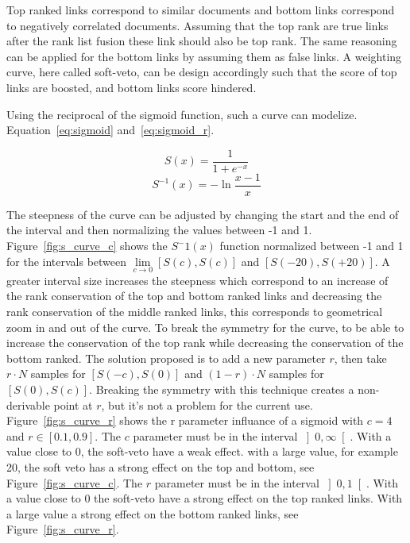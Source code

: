 Top ranked links correspond to similar documents and bottom links correspond to negatively correlated documents.
Assuming that the top rank are true links after the rank list fusion these link should also be top rank.
The same reasoning can be applied for the bottom links by assuming them as false links.
A weighting curve, here called soft-veto, can be design accordingly such that the score of top links are boosted, and bottom links score hindered.

Using the reciprocal of the sigmoid function, such a curve can modelize.
Equation~\ref{eq:sigmoid} and~\ref{eq:sigmoid_r}.

\begin{equation}
  \label{eq:sigmoid}
  S(x) = \frac{1}{1+e^{-x}}
\end{equation}
\begin{equation}
  \label{eq:sigmoid_r}
  S^{-1}(x) = -\ln{\frac{x-1}{x}}
\end{equation}

The steepness of the curve can be adjusted by changing the start and the end of the interval and then normalizing the values between -1 and 1.
Figure~\ref{fig:s_curve_c} shows the $S^-1(x)$ function normalized between -1 and 1 for the intervals between $\lim\limits_{c \rightarrow 0} \left[S(c), S(c)\right]$ and $\left[S(-20), S(+20)\right]$.
A greater interval size increases the steepness which correspond to an increase of the rank conservation of the top and bottom ranked links and decreasing the rank conservation of the middle ranked links, this corresponds to geometrical zoom in and out of the curve.
To break the symmetry for the curve, to be able to increase the conservation of the top rank while decreasing the conservation of the bottom ranked.
The solution proposed is to add a new parameter $r$, then take $r \cdot N$ samples for $\left[S(-c), S(0)\right]$ and $(1-r) \cdot N$ samples for $\left[S(0), S(c)\right]$.
Breaking the symmetry with this technique creates a non-derivable point at $r$, but it's not a problem for the current use.
Figure~\ref{fig:s_curve_r} shows the r parameter influance of a sigmoid with $c = 4$ and $r \in \left[0.1, 0.9\right]$.
The $c$ parameter must be in the interval $\left]0, \infty\right[$.
With a value close to $0$, the soft-veto have a weak effect.
with a large value, for example 20, the soft veto has a strong effect on the top and bottom, see Figure~\ref{fig:s_curve_c}.
The $r$ parameter must be in the interval $\left]0, 1\right[$.
With a value close to $0$ the soft-veto have a strong effect on the top ranked links.
With a large value a strong effect on the bottom ranked links, see Figure~\ref{fig:s_curve_r}.

